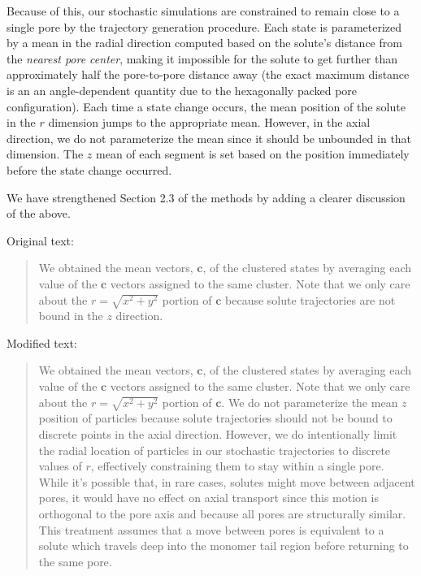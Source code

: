 \documentclass{article}
\begin{document}
\begin{enumerate}[label={Comment \theenumi :}, leftmargin=3.9\parindent]
    Because of this, our stochastic simulations are constrained to remain close to a single 
    pore by the trajectory generation procedure. Each state is parameterized by a mean in 
    the radial direction computed based on the solute's distance from the \textit{nearest 
    pore center}, making it impossible for the solute to get further than approximately half
    the pore-to-pore distance away (the exact maximum distance is an an angle-dependent 
    quantity due to the hexagonally packed pore configuration).
    Each time a state change occurs, the mean position of the solute in the $r$ dimension 
    jumps to the appropriate mean. However, in the axial direction, we do not parameterize 
    the mean since it should be unbounded in that dimension. The $z$ mean of each segment 
    is set based on the position immediately before the state change occurred.
    
    We have strengthened Section 2.3 of the methods by adding a clearer discussion of the above.
    
    Original text:
    \begin{quote}
    We obtained the mean vectors, $\mathbf{c}$, of the clustered states by averaging each 
    value of the $\mathbf{c}$ vectors assigned to the same cluster. Note that we only care 
    about the $r=\sqrt{x^2+y^2}$ portion of $\mathbf{c}$ because solute trajectories are not 
    bound in the $z$ direction.
    \end{quote}
    
    Modified text:
    
    \begin{quote}
    We obtained the mean vectors, $\mathbf{c}$, of the clustered states by averaging each 
    value of the $\mathbf{c}$ vectors assigned to the same cluster. Note that we only care 
    about the $r=\sqrt{x^2+y^2}$ portion of $\mathbf{c}$. We do not parameterize the mean
    $z$ position of particles because solute trajectories should not be bound to discrete
    points in the axial direction. However, we do intentionally limit the radial location 
    of particles in our stochastic trajectories to discrete values of $r$, effectively 
    constraining them to stay within a single pore. While it's possible that, in rare cases,
    solutes might move between adjacent pores, it would have no effect on axial transport
    since this motion is orthogonal to the pore axis and because all pores are structurally
    similar. This treatment assumes that a move between pores is equivalent to a solute 
    which travels deep into the monomer tail region before returning to the same pore. 
    \end{quote}
    

\end{enumerate}
\end{document}
